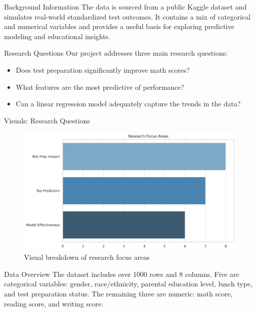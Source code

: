 \documentclass{beamer}
\begin{document}
\begin{frame}{Background Information}
  The data is sourced from a public Kaggle dataset and simulates real-world standardized test outcomes. It contains a mix of categorical and numerical variables and provides a useful basis for exploring predictive modeling and educational insights.
\end{frame}

\begin{frame}{Research Questions}
  Our project addresses three main research questions:
  \begin{itemize}
    \item Does test preparation significantly improve math scores?
    \item What features are the most predictive of performance?
    \item Can a linear regression model adequately capture the trends in the data?
  \end{itemize}
\end{frame}

\begin{frame}{Visuals: Research Questions}
  \begin{figure}
    \includegraphics[width=0.9\linewidth]{research_questions_chart.png}
    \caption{Visual breakdown of research focus areas}
  \end{figure}
\end{frame}

\begin{frame}{Data Overview}
  The dataset includes over 1000 rows and 8 columns. Five are categorical variables: gender, race/ethnicity, parental education level, lunch type, and test preparation status. The remaining three are numeric: math score, reading score, and writing score.
\end{frame}
\end{document}
